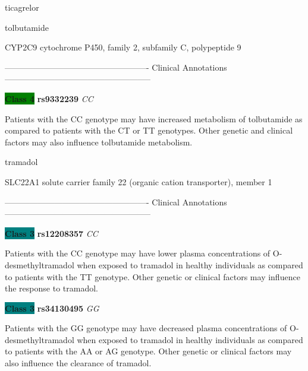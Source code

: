 \documentclass{resume} %
\begin{document}
\begin{rSection}{ ticagrelor }
\end{rSection}\begin{rSection}{ tolbutamide }
\item[]

\begin{rSubsection}{ CYP2C9 }{ cytochrome P450, family 2, subfamily C, polypeptide 9 }{}{}
\item[]

\item[] ---------------------------------------------------- Clinical Annotations -----------------------------------------------------\newline
\item \textbf{\colorbox{green} {Class 4}} \textbf{ rs9332239 } \textit{ CC }
\item[] Patients with the CC genotype may have increased metabolism of tolbutamide as compared to patients with the CT or TT genotypes. Other genetic and clinical factors may also influence tolbutamide metabolism.
\end{rSubsection}

\end{rSection}\begin{rSection}{ tramadol }
\item[]

\begin{rSubsection}{ SLC22A1 }{ solute carrier family 22 (organic cation transporter), member 1 }{}{}
\item[]

\item[] ---------------------------------------------------- Clinical Annotations -----------------------------------------------------\newline
\item \textbf{\colorbox{teal} {Class 3}} \textbf{ rs12208357 } \textit{ CC }
\item[] Patients with the CC genotype may have lower plasma concentrations of O-desmethyltramadol when exposed to tramadol in healthy individuals as compared to patients with the TT genotype. Other genetic or clinical factors may influence the response to tramadol.\item \textbf{\colorbox{teal} {Class 3}} \textbf{ rs34130495 } \textit{ GG }
\item[] Patients with the GG genotype may have decreased plasma concentrations of O-desmethyltramadol when exposed to tramadol in healthy individuals as compared to patients with the AA or AG genotype. Other genetic or clinical factors may also influence the clearance of tramadol.
\end{rSubsection}


\end{rSection}
\end{document}
